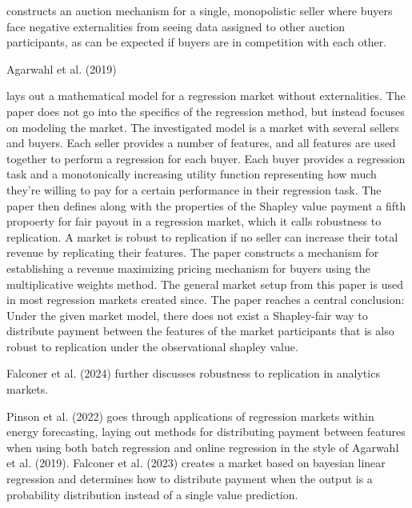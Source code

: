 constructs an auction mechanism for a single, monopolistic seller where buyers
face negative externalities from seeing data assigned to other auction
participants, as can be expected if buyers are in competition with each other.

Agarwahl et al. (2019) %

lays out a mathematical model for a regression market without externalities.
The paper does not go into the specifics of the regression method, but instead
focuses on modeling the market. The investigated model is a market with
several sellers and buyers. Each seller provides a number of features, and all
features are used together to perform a regression for each buyer. Each buyer
provides a regression task and a monotonically increasing utility function
representing how much they're willing to pay for a certain performance in their
regression task. The paper then defines along with the properties of the
Shapley value payment a fifth propoerty for fair payout in a regression market,
which it calls robustness to replication. A market is robust to replication if
no seller can increase their total revenue by replicating their features. The
paper constructs a mechanism for establishing a revenue maximizing pricing
mechanism for buyers using the multiplicative weights method. The general
market setup from this paper is used in most regression markets created since.
The paper reaches a central conclusion: Under the given market model, there
does not exist a Shapley-fair way to distribute payment between the features of
the market participants that is also robust to replication under the
observational shapley value. 


Falconer et al. (2024) further discusses robustness to replication in analytics markets.

Pinson et al. (2022) %
goes through applications of regression markets within energy forecasting, laying out methods for distributing payment
between features when using both batch regression and online regression in the style of Agarwahl et al. (2019).
Falconer et al. (2023) %
creates a market based on bayesian linear regression and determines how to distribute payment when the output is a
probability distribution instead of a single value prediction. %

